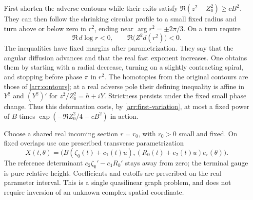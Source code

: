 First shorten the adverse contours while their exits satisfy
$\Re(z^2-Z_0^2)\geq cB^2$.  They can then follow the shrinking circular
profile to a small fixed radius and turn above or below zero in $r^2$,
ending near $\arg r^2=\pm2\pi/3$.  On a turn require
\begin{equation}\label{jump:turn}
 \Re\,d\log r<0,\qquad
 \Re\bigl(Z^2d(r^2)\bigr)<0.
\end{equation}
The inequalities have fixed margins after parametrization.  They say
that the angular diffusion advances and that the real fast exponent
increases.  One obtains them by starting with a radial decrease,
turning on a slightly contracting spiral, and stopping before phase
$\pi$ in $r^2$.  The homotopies from the original contours are those of
\cref{arr:contours}; at a real adverse pole their defining inequality
is affine in $Y^2$ and $(Y^2)'$ for $z^2/Z_0^2=h+iY$.  Strictness
persists under the fixed small phase change.  Thus this deformation
costs, by \cref{arr:first-variation}, at most a fixed power of $B$ times
$\exp(-\Re Z_0^2/4-cB^2)$ in action.

Choose a shared real incoming section $r=r_0$, with $r_0>0$ small and
fixed.  On fixed overlaps use one prescribed transverse parametrization
\[
 X(t,\theta)=
 \bigl(B(\zeta_0(t)+c_1(t)u),
       (R_0(t)+c_2(t)u)e_r(\theta)\bigr).
\]
The reference determinant $c_2\zeta_0'-c_1R_0'$ stays away from zero;
the terminal gauge is pure relative height.  Coefficients and cutoffs
are prescribed on the real parameter interval.  This is a single
quasilinear graph problem, and does not require inversion of an
unknown complex spatial coordinate.

